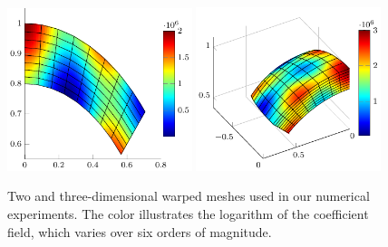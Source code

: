\documentclass[times]{nlaauth}
\newcommand{\bs}[1]{\ensuremath{\boldsymbol #1}}
\begin{document}
\begin{figure}
	\includegraphics[width=0.48\textwidth]{figs/fan2d}
	\includegraphics[width=0.48\textwidth]{figs/fan3d}
	\caption{\label{fig:mesh} Two and three-dimensional warped
          meshes used in our numerical experiments. The color
          illustrates the logarithm of the coefficient field, which
          varies over six orders of magnitude.}
\end{figure}
\end{document}
